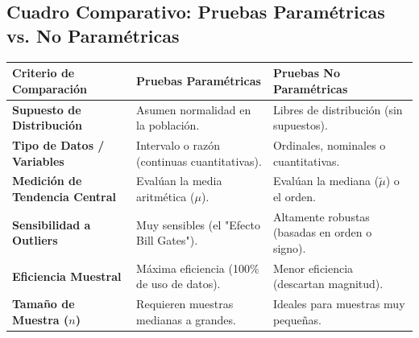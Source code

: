 \documentclass[11pt,a4paper]{article}
\begin{document}
\subsection{Cuadro Comparativo: Pruebas Paramétricas vs. No Paramétricas}
\begin{table}[h!]
    \centering
    \small
    \begin{tabular}{p{3.5cm} p{6cm} p{6cm}}
        \toprule
        \textbf{Criterio de Comparación} & \textbf{Pruebas Paramétricas} & \textbf{Pruebas No Paramétricas} \\
        \midrule
        \textbf{Supuesto de Distribución} & Asumen normalidad en la población. & Libres de distribución (sin supuestos). \\
        \textbf{Tipo de Datos / Variables} & Intervalo o razón (continuas cuantitativas). & Ordinales, nominales o cuantitativas. \\
        \textbf{Medición de Tendencia Central} & Evalúan la media aritmética ($\mu$). & Evalúan la mediana ($\tilde{\mu}$) o el orden. \\
        \textbf{Sensibilidad a Outliers} & Muy sensibles (el "Efecto Bill Gates"). & Altamente robustas (basadas en orden o signo). \\
        \textbf{Eficiencia Muestral} & Máxima eficiencia (100\% de uso de datos). & Menor eficiencia (descartan magnitud). \\
        \textbf{Tamaño de Muestra ($n$)} & Requieren muestras medianas a grandes. & Ideales para muestras muy pequeñas. \\
        \bottomrule
    \end{tabular}
\end{table}
\end{document}
